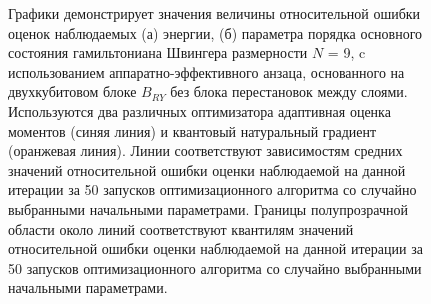 \documentclass[14pt]{extarticle}
\begin{document}
\begin{figure}[H]
\begin{minipage}[h]{1.\linewidth}
\end{minipage}
\vfill
\begin{minipage}[H]{1.\linewidth}
\end{minipage}
\caption{Графики демонстрирует значения величины относительной ошибки оценок наблюдаемых (а) энергии, (б) параметра порядка основного состояния гамильтониана Швингера размерности $N$ = 9, c использованием аппаратно-эффективного анзаца, основанного на двухкубитовом блоке $B_{RY}$ без блока перестановок между слоями. Используются два различных оптимизатора адаптивная оценка моментов (синяя линия) и квантовый натуральный градиент (оранжевая линия). Линии соответствуют зависимостям средних значений относительной ошибки оценки наблюдаемой на данной итерации за 50 запусков оптимизационного алгоритма со случайно выбранными начальными параметрами. Границы полупрозрачной области около линий соответствуют квантилям значений относительной ошибки оценки наблюдаемой на данной итерации за 50 запусков оптимизационного алгоритма со случайно выбранными начальными параметрами. }\label{fig:opt_comparence}
\end{figure}
\end{document}

